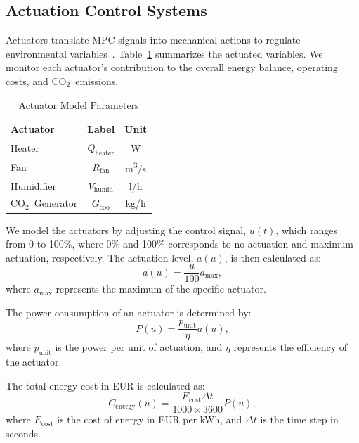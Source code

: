 \documentclass[conference]{IEEEtran}
\newcommand{\ui}[2]{#1_{\mathrm{#2}}}
\newcommand{\coo}{\ensuremath{\mathrm{CO_2}}}
\begin{document}
\subsection{Actuation Control Systems}
Actuators translate MPC signals into mechanical actions to regulate environmental variables~\cite{Butterfield2018}. Table~\ref{tab:actuators} summarizes the actuated variables. We monitor each actuator's contribution to the overall energy balance, operating costs, and \coo\ emissions.
\begin{table}
    \centering
    \caption{Actuator Model Parameters}\label{tab:actuators}
    \begin{tabular}{lcc}
        \toprule
        Actuator        & Label                & Unit                   \\
        \midrule
        Heater          & \( \ui{Q}{heater} \) & W                      \\
        Fan             & \( \ui{R}{fan} \)    & m\textsuperscript{3}/s \\
        Humidifier      & \( \ui{V}{humid} \)  & l/h                    \\
        \coo\ Generator & \( \ui{G}{coo} \)    & kg/h                   \\
        \bottomrule
    \end{tabular}
\end{table}
We model the actuators by adjusting the control signal, \( u(t) \), which ranges from 0 to 100\%, where 0\% and 100\% corresponds to no actuation and maximum actuation, respectively. The actuation level, \( a(u) \), is then calculated as:
\begin{equation}
    a(u) = \frac{u}{100}  \ui{a}{\max},
\end{equation}
where \( \ui{a}{\max} \) represents the maximum of the specific actuator.

The power consumption of an actuator is determined by:
\begin{equation}
    P(u) = \frac{\ui{p}{unit}}{\eta}  a(u),
\end{equation}
where \( \ui{p}{unit} \) is the power per unit of actuation, and \( \eta \) represents the efficiency of the actuator.

The total energy cost in EUR is calculated as:
\begin{equation}
    \ui{C}{energy}(u) = \frac{\ui{E}{cost}  \Delta t}{1000 \times 3600}  P(u),
\end{equation}
where \( \ui{E}{cost} \) is the cost of energy in EUR per kWh, and \( \Delta t \) is the time step in seconds.
\end{document}
